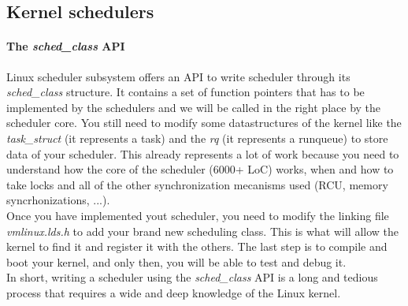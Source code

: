\subsection{Kernel schedulers}

\paragraph{The \textit{sched\_class} API}

\par Linux scheduler subsystem offers an API to write scheduler through its \textit{sched\_class} structure. It contains a set of function pointers that has to be implemented by the schedulers and we will be called in the right place by the scheduler core. You still need to modify some datastructures of the kernel like the \textit{task\_struct} (it represents a task) and the \textit{rq} (it represents a runqueue) to store data of your scheduler. This already represents a lot of work because you need to understand how the core of the scheduler (6000+ LoC) works, when and how to take locks and all of the other synchronization mecanisms used (RCU, memory syncrhonizations, ...). \\ Once you have implemented yout scheduler, you need to modify the linking file \textit{vmlinux.lds.h} to add your brand new scheduling class. This is what will allow the kernel to find it and register it with the others. The last step is to compile and boot your kernel, and only then, you will be able to test and debug it. \\ 
In short, writing a scheduler using the \textit{sched\_class} API is a long and tedious process that requires a wide and deep knowledge of the Linux kernel. 



